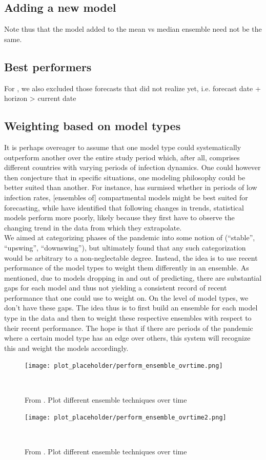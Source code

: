 \subsection{Adding a new model}
Note thus that the model added to the mean vs median ensemble need not be the same.
\subsection{Best performers}
For , we also excluded those forecasts that did not realize yet, i.e. forecast date + horizon > current date
\subsection{Weighting based on model types}
It is perhaps overeager to assume that one model type could systematically outperform another over the entire study period which, after all, comprises different countries with varying periods of infection dynamics. One could however then conjecture that in specific situations, one modeling philosophy could be better suited than another. For instance, \citep{taylor_combining_2021} has surmised whether in periods of low infection rates, [ensembles of] compartmental models might be best suited for forecasting, while \citep{bracher_pre-registered_2021} have identified that following changes in trends, statistical models perform more poorly, likely because they first have to observe the changing trend in the data from which they extrapolate.\\
We aimed at categorizing phases of the pandemic into some notion of (``stable'', ``upswing'', ``downswing''), but ultimately found that any such categorization would be arbitrary to a non-neglectable degree. Instead, the idea is to use recent performance of the model types to weight them differently in an ensemble. As mentioned, due to models dropping in and out of predicting, there are substantial gaps for each model and thus not yielding a consistent record of recent performance that one could use to weight on. On the level of model types, we don't have these gaps. The idea thus is to first build an ensemble for each model type in the data and then to weight these respective ensembles with respect to their recent performance. The hope is that if there are periods of the pandemic where a certain model type has an edge over others, this system will recognize this and weight the models accordingly. 
\begin{figure}
\centering
\texttt{[image: plot\_placeholder/perform\_ensemble\_ovrtime.png]}
\caption{From \cite{ray_ensemble_2020}. Plot different ensemble techniques over time}
\
\end{figure}
\begin{figure}
\centering
\texttt{[image: plot\_placeholder/perform\_ensemble\_ovrtime2.png]}
\caption{From \cite{ray_ensemble_2020}. Plot different ensemble techniques over time}
\
\end{figure}


